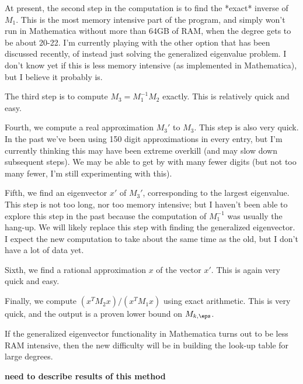 At present, the second step in the computation is to find the *exact* inverse of $M_1$.  This is the most memory intensive part of the program, and simply won't run in Mathematica without more than 64GB of RAM, when the degree gets to be about 20-22.  I'm currently playing with the other option that has been discussed recently, of instead just solving the generalized eigenvalue problem.  I don't know yet if this is less memory intensive (as implemented in Mathematica), but I believe it probably is.

The third step is to compute $M_3= M_1^{-1}M_2$ exactly.  This is relatively quick and easy.

Fourth, we compute a real approximation $M_3'$ to $M_3$.  This step is also very quick.  In the past we've been using 150 digit approximations in every entry, but I'm currently thinking this may have been extreme overkill (and may slow down subsequent steps).  We may be able to get by with many fewer digits (but not too many fewer, I'm still experimenting with this).

Fifth, we find an eigenvector $x'$ of $M_3'$, corresponding to the largest eigenvalue.  This step is not too long, nor too memory intensive; but I haven't been able to explore this step in the past because the computation of $M_1^{-1}$ was usually the hang-up.  We will likely replace this step with finding the generalized eigenvector. I expect the new computation to take about the same time as the old, but I don't have a lot of data yet.

Sixth, we find a rational approximation $x$ of the vector $x'$.  This is again very quick and easy.

Finally, we compute $(x^{T}M_2 x)/(x^{T}M_1 x)$ using exact arithmetic.  This is very quick, and the output is a proven lower bound on $M_{k,\eps}$.

If the generalized eigenvector functionality in Mathematica turns out to be less RAM intensive, then the new difficulty will be in building the look-up table for large degrees.


{\bf need to describe results of this method}



